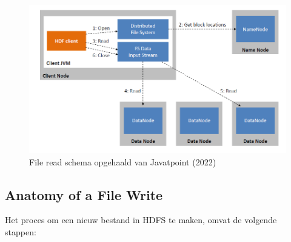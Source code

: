 \documentclass[a4paper,10pt,twoside]{report}
\begin{document}
\begin{figure}
	\includegraphics[width=\linewidth]{images/HDFS-Read.png}
	\caption{File read schema opgehaald van Javatpoint (2022)}
\end{figure}

\subsection{Anatomy of a File Write}

Het proces om een nieuw bestand in HDFS te maken, omvat de volgende stappen:
\end{document}
